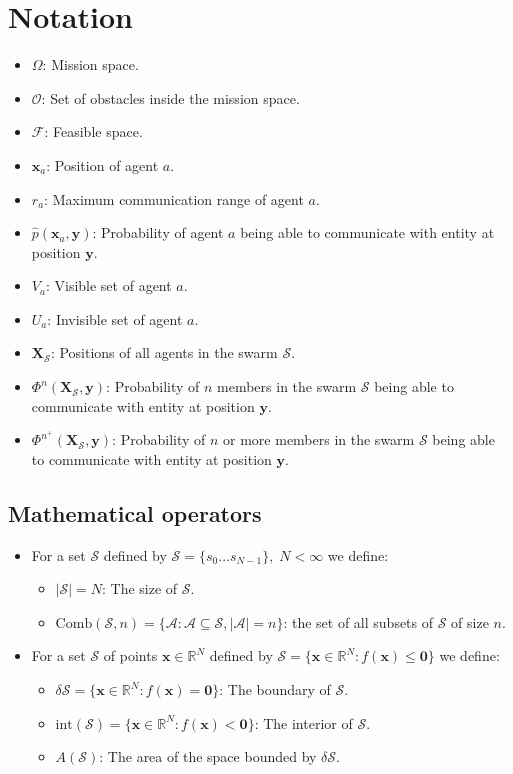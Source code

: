 \section{Notation}
\begin{itemize}
  \item $\Omega$: Mission space.
  \item $\mathcal{O}$: Set of obstacles inside the mission space.
  \item $\mathcal{F}$: Feasible space.
  \item $\mathbf{x}_{a}$: Position of agent $a$.
  \item $r_{a}$: Maximum communication range of agent $a$.
  \item $\hat{p}(\mathbf{x}_{a}, \mathbf{y})$: Probability of agent $a$ being able to communicate with entity at position $\mathbf{y}$.
  \item $V_{a}$: Visible set of agent $a$.
  \item $U_{a}$: Invisible set of agent $a$.
  \item $\mathbf{X}_{\mathcal{S}}$: Positions of all agents in the swarm $\mathcal{S}$.
  \item $\Phi^{n}(\mathbf{X_{\mathcal{S}}}, \mathbf{y})$: Probability of $n$ members in the swarm $\mathcal{S}$ being able to communicate with entity at position $\mathbf{y}$.
  \item $\Phi^{n^{+}}(\mathbf{X_{\mathcal{S}}}, \mathbf{y})$: Probability of $n$ or more members in the swarm $\mathcal{S}$ being able to communicate with entity at position $\mathbf{y}$.
\end{itemize}

\subsection{Mathematical operators}
\begin{itemize}
  \item For a set $\mathcal{S}$ defined by $\mathcal{S} = \{s_{0}\hdots s_{N-1}\},\;N<\infty$ we define:
  \begin{itemize}
    \item $|\mathcal{S}| = N$: The size of $\mathcal{S}$.
    \item $\mathrm{Comb}(\mathcal{S}, n) = \{\mathcal{A}: \mathcal{A}\subseteq\mathcal{S}, |\mathcal{A}|=n\}$: the set of all subsets of $\mathcal{S}$ of size $n$.
  \end{itemize}
  \item For a set $\mathcal{S}$ of points $\mathbf{x}\in\mathbb{R}^{N}$ defined by $\mathcal{S} = \{\mathbf{x}\in\mathbb{R}^{N}: f(\mathbf{x})\leq\mathbf{0}\}$ we define:
  \begin{itemize}
    \item $\delta\mathcal{S} = \{\mathbf{x}\in\mathbb{R}^{N}: f(\mathbf{x}) = \mathbf{0}\}$: The boundary of $\mathcal{S}$.
    \item $\mathrm{int}(\mathcal{S}) = \{\mathbf{x}\in\mathbb{R}^{N}: f(\mathbf{x}) < \mathbf{0}\}$: The interior of $\mathcal{S}$.
    \item $A(\mathcal{S})$: The area of the space bounded by $\delta\mathcal{S}$.
  \end{itemize}
\end{itemize}